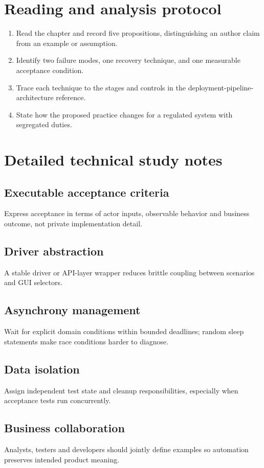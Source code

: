\documentclass[10pt,letterpaper]{article}
\begin{document}
\section{Reading and analysis protocol}
\begin{enumerate}
\item Read the chapter and record five propositions, distinguishing an author claim from an example or assumption.
\item Identify two failure modes, one recovery technique, and one measurable acceptance condition.
\item Trace each technique to the stages and controls in the deployment-pipeline-architecture reference.
\item State how the proposed practice changes for a regulated system with segregated duties.
\end{enumerate}

\section{Detailed technical study notes}
\subsection{Executable acceptance criteria}
Express acceptance in terms of actor inputs, observable behavior and business outcome, not private implementation detail.

\subsection{Driver abstraction}
A stable driver or API-layer wrapper reduces brittle coupling between scenarios and GUI selectors.

\subsection{Asynchrony management}
Wait for explicit domain conditions within bounded deadlines; random sleep statements make race conditions harder to diagnose.

\subsection{Data isolation}
Assign independent test state and cleanup responsibilities, especially when acceptance tests run concurrently.

\subsection{Business collaboration}
Analysts, testers and developers should jointly define examples so automation preserves intended product meaning.
\end{document}
